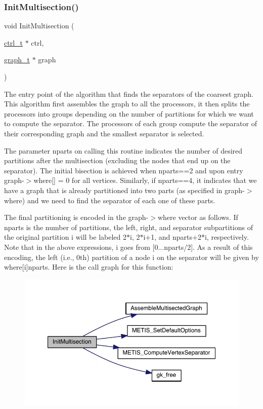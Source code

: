 \subsubsection{\texorpdfstring{Init\+Multisection()}{InitMultisection()}}
{\footnotesize\ttfamily void Init\+Multisection (\begin{DoxyParamCaption}\item[{\hyperlink{a00742}{ctrl\+\_\+t} $\ast$}]{ctrl,  }\item[{\hyperlink{a00734}{graph\+\_\+t} $\ast$}]{graph }\end{DoxyParamCaption})}

The entry point of the algorithm that finds the separators of the coarsest graph. This algorithm first assembles the graph to all the processors, it then splits the processors into groups depending on the number of partitions for which we want to compute the separator. The processors of each group compute the separator of their corresponding graph and the smallest separator is selected.

The parameter nparts on calling this routine indicates the number of desired partitions after the multisection (excluding the nodes that end up on the separator). The initial bisection is achieved when nparts==2 and upon entry graph-\/$>$where\mbox{[}\mbox{]} = 0 for all vertices. Similarly, if nparts==4, it indicates that we have a graph that is already partitioned into two parts (as specified in graph-\/$>$where) and we need to find the separator of each one of these parts.

The final partitioning is encoded in the graph-\/$>$where vector as follows. If nparts is the number of partitions, the left, right, and separator subpartitions of the original partition i will be labeled 2$\ast$i, 2$\ast$i+1, and nparts+2$\ast$i, respectively. Note that in the above expressions, i goes from \mbox{[}0...nparts/2\mbox{]}. As a result of this encoding, the left (i.\+e., 0th) partition of a node {\ttfamily i} on the separator will be given by where\mbox{[}i\mbox{]}nparts. Here is the call graph for this function\+:\nopagebreak
\begin{figure}[H]
\begin{center}
\leavevmode
\includegraphics[width=350pt]{a00365_ad2642ed6985ca20fc79c0a5b52c5424b_cgraph}
\end{center}
\end{figure}
